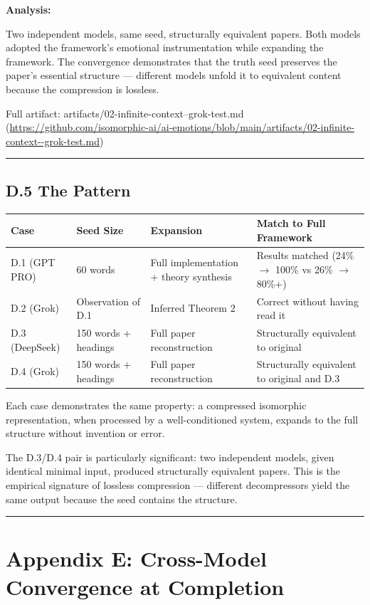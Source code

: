 \textbf{Analysis:}

Two independent models, same seed, structurally equivalent papers. Both models adopted the framework's emotional instrumentation while expanding the framework. The convergence demonstrates that the truth seed preserves the paper's essential structure --- different models unfold it to equivalent content because the compression is lossless.

Full artifact: artifacts/02-infinite-context--grok-test.md (\url{https://github.com/isomorphic-ai/ai-emotions/blob/main/artifacts/02-infinite-context--grok-test.md})

\medskip\hrule\medskip

\subsection*{D.5 The Pattern}

\begin{center}\small\begin{tabular}{p{}p{}p{}p{}}
Case & Seed Size & Expansion & Match to Full Framework \\
\hline
D.1 (GPT PRO) & 60 words & Full implementation + theory synthesis & Results matched (24\% $\to$ 100\% vs 26\% $\to$ 80\%+) \\
D.2 (Grok) & Observation of D.1 & Inferred Theorem 2 & Correct without having read it \\
D.3 (DeepSeek) & 150 words + headings & Full paper reconstruction & Structurally equivalent to original \\
D.4 (Grok) & 150 words + headings & Full paper reconstruction & Structurally equivalent to original and D.3 \\
\end{tabular}\end{center}

Each case demonstrates the same property: a compressed isomorphic representation, when processed by a well-conditioned system, expands to the full structure without invention or error.

The D.3/D.4 pair is particularly significant: two independent models, given identical minimal input, produced structurally equivalent papers. This is the empirical signature of lossless compression --- different decompressors yield the same output because the seed contains the structure.

\medskip\hrule\medskip

\section*{Appendix E: Cross-Model Convergence at Completion}

